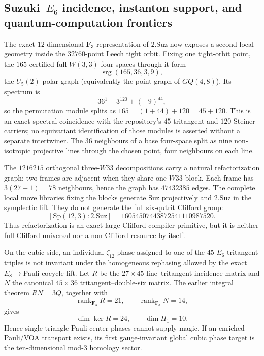 \subsection{Suzuki--$E_6$ incidence, instanton support, and quantum-computation frontiers}
\label{sec:20260916-suzuki-e6-instanton-qc}

The exact $12$-dimensional $\mathbf F_3$ representation of $2.\mathrm{Suz}$ now exposes a second local geometry inside the $32760$-point Leech tight orbit.  Fixing one tight-orbit point, the $165$ certified full $W(3,3)$ four-spaces through it form
\[
 \operatorname{srg}(165,36,3,9),
\]
the $U_5(2)$ polar graph (equivalently the point graph of $GQ(4,8)$).  Its spectrum is
\[
 36^1+3^{120}+(-9)^{44},
\]
so the permutation module splits as $165=(1+44)+120=45+120$.  This is an exact spectral coincidence with the repository's $45$ tritangent and $120$ Steiner carriers; no equivariant identification of those modules is asserted without a separate intertwiner.  The $36$ neighbours of a base four-space split as nine non-isotropic projective lines through the chosen point, four neighbours on each line.

The $1216215$ orthogonal three-$W33$ decompositions carry a natural refactorization graph: two frames are adjacent when they share one $W33$ block.  Each frame has $3(27-1)=78$ neighbours, hence the graph has $47432385$ edges.  The complete local move libraries fixing the blocks generate $\mathrm{Suz}$ projectively and $2.\mathrm{Suz}$ in the symplectic lift.  They do not generate the full six-qutrit Clifford group:
\[
 [\mathrm{Sp}(12,3):2.\mathrm{Suz}]
 =16054507443872541110987520.
\]
Thus refactorization is an exact large Clifford compiler primitive, but it is neither full-Clifford universal nor a non-Clifford resource by itself.

On the cubic side, an individual $\zeta_{12}$ phase assigned to one of the $45$ $E_6$ tritangent triples is not invariant under the homogeneous rephasing allowed by the exact $E_8\to$Pauli cocycle lift.  Let $R$ be the $27\times45$ line--tritangent incidence matrix and $N$ the canonical $45\times36$ tritangent--double-six matrix.  The earlier integral theorem $RN=3Q$, together with
\[
 \operatorname{rank}_{\mathbf F_3}R=21,
 \qquad
 \operatorname{rank}_{\mathbf F_3}N=14,
\]
gives
\[
 \dim\ker R=24,
 \qquad
 \dim H_1=10.
\]
Hence single-triangle Pauli-center phases cannot supply magic.  If an enriched Pauli/VOA transport exists, its first gauge-invariant global cubic phase target is the ten-dimensional mod-$3$ homology sector.

